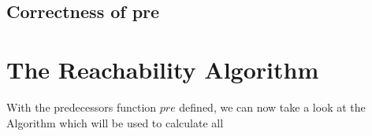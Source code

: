 

\subsection{Correctness of pre}

\section{The Reachability Algorithm}
With the predecessors function $pre$ defined, we can now take a look at the Algorithm which will be used to calculate all


\cite{abdulla2013monotonic}

